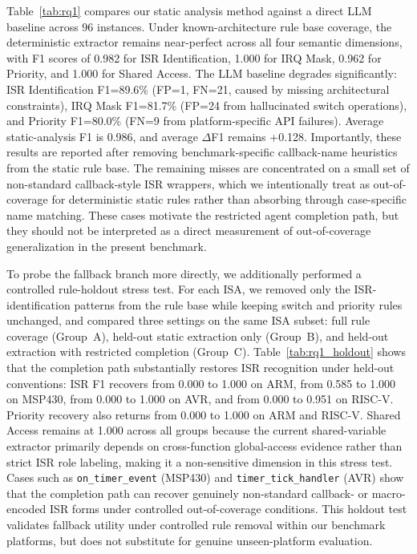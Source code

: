 \documentclass[conference]{IEEEtran}
\begin{document}
Table~\ref{tab:rq1} compares our static analysis method against a direct LLM baseline across 96 instances. Under known-architecture rule base coverage, the deterministic extractor remains near-perfect across all four semantic dimensions, with F1 scores of 0.982 for ISR Identification, 1.000 for IRQ Mask, 0.962 for Priority, and 1.000 for Shared Access. The LLM baseline degrades significantly: ISR Identification F1=89.6\% (FP=1, FN=21, caused by missing architectural constraints), IRQ Mask F1=81.7\% (FP=24 from hallucinated switch operations), and Priority F1=80.0\% (FN=9 from platform-specific API failures). Average static-analysis F1 is 0.986, and average $\Delta$F1 remains +0.128. Importantly, these results are reported after removing benchmark-specific callback-name heuristics from the static rule base. The remaining misses are concentrated on a small set of non-standard callback-style ISR wrappers, which we intentionally treat as out-of-coverage for deterministic static rules rather than absorbing through case-specific name matching. These cases motivate the restricted agent completion path, but they should not be interpreted as a direct measurement of out-of-coverage generalization in the present benchmark.

To probe the fallback branch more directly, we additionally performed a controlled rule-holdout stress test. For each ISA, we removed only the ISR-identification patterns from the rule base while keeping switch and priority rules unchanged, and compared three settings on the same ISA subset: full rule coverage (Group~A), held-out static extraction only (Group~B), and held-out extraction with restricted completion (Group~C). Table~\ref{tab:rq1_holdout} shows that the completion path substantially restores ISR recognition under held-out conventions: ISR F1 recovers from 0.000 to 1.000 on ARM, from 0.585 to 1.000 on MSP430, from 0.000 to 1.000 on AVR, and from 0.000 to 0.951 on RISC-V. Priority recovery also returns from 0.000 to 1.000 on ARM and RISC-V. Shared Access remains at 1.000 across all groups because the current shared-variable extractor primarily depends on cross-function global-access evidence rather than strict ISR role labeling, making it a non-sensitive dimension in this stress test. Cases such as \texttt{on\_timer\_event} (MSP430) and \texttt{timer\_tick\_handler} (AVR) show that the completion path can recover genuinely non-standard callback- or macro-encoded ISR forms under controlled out-of-coverage conditions. This holdout test validates fallback utility under controlled rule removal within our benchmark platforms, but does not substitute for genuine unseen-platform evaluation.
\end{document}
